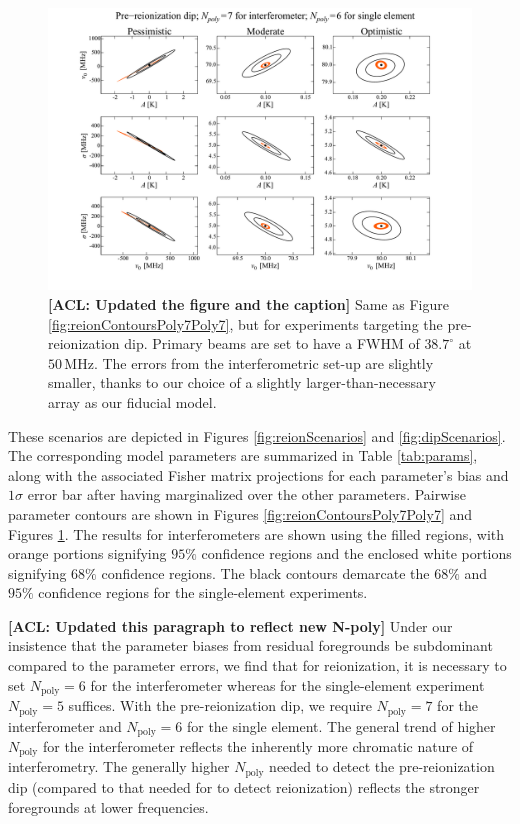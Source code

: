 \documentclass[twocolumn,apj,numberedappendix]{emulateapj}
\newcommand{\acl}[1]{{\color{red} \textbf{[ACL:  #1]}}}
\begin{document}
\begin{figure}[t]
	\centering
	\includegraphics[width=1.00\textwidth,trim=3cm 2cm 3cm 0cm,clip]{figures/dipContoursPoly7Poly6.pdf}
	\caption{\acl{Updated the figure and the caption} Same as Figure \ref{fig:reionContoursPoly7Poly7}, but for experiments targeting the pre-reionization dip. Primary beams are set to have a FWHM of $38.7^\circ$ at $50\,\textrm{MHz}$. The errors from the interferometric set-up are slightly smaller, thanks to our choice of a slightly larger-than-necessary array as our fiducial model.}
	\label{fig:dipContoursPoly7Poly6}
\end{figure}

These scenarios are depicted in Figures \ref{fig:reionScenarios} and  \ref{fig:dipScenarios}. The corresponding model parameters are summarized in Table \ref{tab:params}, along with the associated Fisher matrix projections for each parameter's bias and $1\sigma$ error bar after having marginalized over the other parameters. Pairwise parameter contours are shown in Figures \ref{fig:reionContoursPoly7Poly7} and Figures \ref{fig:dipContoursPoly7Poly6}. The results for interferometers are shown using the filled regions, with orange portions signifying $95\%$ confidence regions and the enclosed white portions signifying $68\%$ confidence regions. The black contours demarcate the $68\%$ and $95\%$ confidence regions for the single-element experiments.

\acl{Updated this paragraph to reflect new N-poly}
Under our insistence that the parameter biases from residual foregrounds be subdominant compared to the parameter errors, we find that for reionization, it is necessary to set $N_\textrm{poly} = 6$ for the interferometer whereas for the single-element experiment $N_\textrm{poly} = 5$ suffices. With the pre-reionization dip, we require $N_\textrm{poly} = 7$ for the interferometer and $N_\textrm{poly} = 6$ for the single element. The general trend of higher $N_\textrm{poly}$ for the interferometer reflects the inherently more chromatic nature of interferometry. The generally higher $N_\textrm{poly}$ needed to detect the pre-reionization dip (compared to that needed for to detect reionization) reflects the stronger foregrounds at lower frequencies.
\end{document}
